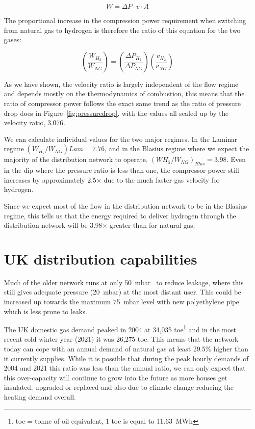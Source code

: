 \documentclass[5p]{elsarticle} %
\begin{document}
\begin{equation}
\label{eqn:power}
 W = \Delta P \cdot v \cdot A 
\end{equation}

The proportional increase in the compression power requirement when switching from natural gas to hydrogen is therefore the ratio of this equation for the two gases:

\begin{equation}
\label{eqn:powerratio}
    \left(\frac{W_{H_2}}{W_{NG}}\right) =
    \left(\frac{\Delta P_{H_2}}{\Delta P_{NG}}\right)
    \left(\frac{v_{H_2}}{v_{NG}}\right)
\end{equation}

As we have shown, the velocity ratio is largely independent of the flow regime and depends mostly on the thermodynamics of combustion, this means that the ratio of compressor power follows the exact same trend as the ratio of pressure drop does in Figure~\ref{fig:pressuredrop}, with the values all scaled up by the velocity ratio, 3.076.

We can calculate individual values for the two major regimes.
In the Laminar regime $(W_{H_2}/W_{NG}){Lam} = 7.76$, and in the Blasius regime where we expect the majority of the distribution network to operate, $(W{H_2}/W_{NG})_{Blas} = 3.98$.
Even in the dip where the pressure ratio is less than one, the compressor power still increases by approximately 2.5$\times$ due to the much faster gas velocity for hydrogen.

Since we expect most of the flow in the distribution network to be in the Blasius regime, this tells us that the energy required to deliver hydrogen through the distribution network will be 3.98$\times$ greater than for natural gas.

\section{UK distribution capabilities}
\label{sec:distcapable}

Much of the older network runs at only 50~mbar~\cite{ARUP2023} to reduce leakage, where this still gives adequate pressure (20~mbar) at the most distant user. 
This could be increased up towards the maximum 75~mbar level with new polyethylene pipe which is less prone to leaks\citep{ARUP2023}. 

The UK domestic gas demand\citep{DESNZ2023a} peaked in 2004 at 34,035 toe\footnote{toe = tonne of oil equivalent, 1 toe is equal to 11.63~MWh} and in the most recent cold winter year (2021) it was 26,275 toe. 
This means that the network today can cope with an annual demand of natural gas at least 29.5\% higher than it currently supplies.
While it is possible that during the peak hourly demands of 2004 and 2021 this ratio was less than the annual ratio, we can only expect that this over-capacity will continue to grow into the future as more houses get insulated, upgraded or replaced and also due to climate change reducing the heating demand overall\citep{Christidis2021}. 
\end{document}
